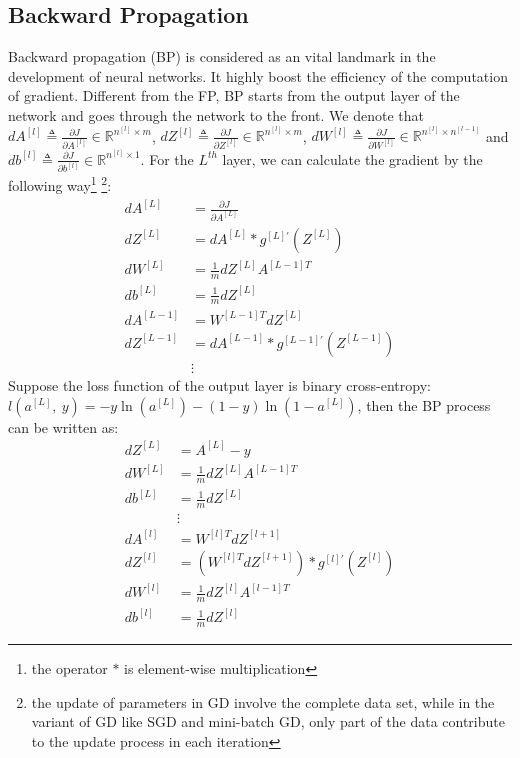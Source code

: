 \subsection{Backward Propagation}
Backward propagation (BP) is considered as an vital landmark in the 
development of neural networks. It highly boost the efficiency of the
computation of gradient. Different from the FP, BP starts from the output
layer of the network and goes through the network to the front. 
We denote that 
$ dA^{[l]} \triangleq \frac{\partial J}{\partial A^{[l]}} 
\in \mathbb{R}^{n^{[l]}\times m} $,
$ dZ^{[l]} \triangleq \frac{\partial J}{\partial Z^{[l]}} 
\in \mathbb{R}^{n^{[l]}\times m} $,
$ dW^{[l]} \triangleq \frac{\partial J}{\partial W^{[l]}} 
\in \mathbb{R}^{n^{[l]}\times n^{[l-1]}} $ and
$ db^{[l]} \triangleq \frac{\partial J}{\partial b^{[l]}} 
\in \mathbb{R}^{n^{[l]}\times 1} $.
For the $ L^{th} $ layer, we can calculate the gradient by the following
way\footnote{the operator $*$ is element-wise multiplication}
\footnote{the update of parameters in GD involve the complete data set, 
while in the variant of GD like SGD and mini-batch GD, only part of the data
contribute to the update process in each iteration}:
\begin{equation}
    \begin{split}
        dA^{[L]} & = \frac{\partial J}{\partial A^{[L]}} \\
        dZ^{[L]} & = dA^{[L]}*g^{[L]'}(Z^{[L]}) \\
        dW^{[L]} & = \frac{1}{m}dZ^{[L]}A^{[L-1]T} \\
        db^{[L]} & = \frac{1}{m}dZ^{[L]} \\
        dA^{[L-1]} & = W^{[L-1]T}dZ^{[L]} \\
        dZ^{[L-1]} & = dA^{[L-1]}*g^{[L-1]'}(Z^{[L-1]}) \\
        & \vdots
    \end{split}
\end{equation}
Suppose the loss function of the output layer is binary cross-entropy: \\
$ l(a^{[L]},\ y) = - y\ln(a^{[L]}) - (1-y)\ln(1-a^{[L]}) $, then 
the BP process can be written as:
\begin{equation}
    \label{equ:BP}
    \begin{split}
        dZ^{[L]} & = A^{[L]} - y \\
        dW^{[L]} & = \frac{1}{m}dZ^{[L]}A^{[L-1]T} \\
        db^{[L]} & = \frac{1}{m}dZ^{[L]} \\
        & \vdots \\
        dA^{[l]} & = W^{[l]T}dZ^{[l+1]} \\
        dZ^{[l]} & = (W^{[l]T}dZ^{[l+1]})*g^{[l]'}(Z^{[l]}) \\
        dW^{[l]} & = \frac{1}{m}dZ^{[l]}A^{[l-1]T} \\
        db^{[l]} & = \frac{1}{m}dZ^{[l]}
    \end{split}
\end{equation}